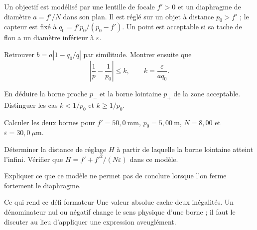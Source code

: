 \label{ch01-ex-D1}
Un objectif est modélisé par une lentille de focale $f'>0$ et un diaphragme de diamètre $a=f'/N$ dans son plan. Il est réglé sur un objet à distance $p_0>f'$ ; le capteur est fixé à $q_0=f'p_0/(p_0-f')$. Un point est acceptable si sa tache de flou a un diamètre inférieur à $\varepsilon$.
\begin{questions}
\item Retrouver $b=a|1-q_0/q|$ par similitude. Montrer ensuite que
\[\left|\frac1p-\frac1{p_0}\right|\leq k,\qquad k=\frac{\varepsilon}{a q_0}.\]
\item En déduire la borne proche $p_-$ et la borne lointaine $p_+$ de la zone acceptable. Distinguer les cas $k<1/p_0$ et $k\geq1/p_0$.
\item Calculer les deux bornes pour $f'=50{,}0\ \mathrm{mm}$, $p_0=5{,}00\ \mathrm{m}$, $N=8{,}00$ et $\varepsilon=30{,}0\ \mu\mathrm{m}$.
\item Déterminer la distance de réglage $H$ à partir de laquelle la borne lointaine atteint l'infini. Vérifier que $H=f'+f'^2/(N\varepsilon)$ dans ce modèle.
\item Expliquer ce que ce modèle ne permet pas de conclure lorsque l'on ferme fortement le diaphragme.
\end{questions}
\begin{methode}{Ce qui rend ce défi formateur}
Une valeur absolue cache deux inégalités. Un dénominateur nul ou négatif change le sens physique d'une borne ; il faut le discuter au lieu d'appliquer une expression aveuglément.
\end{methode}

